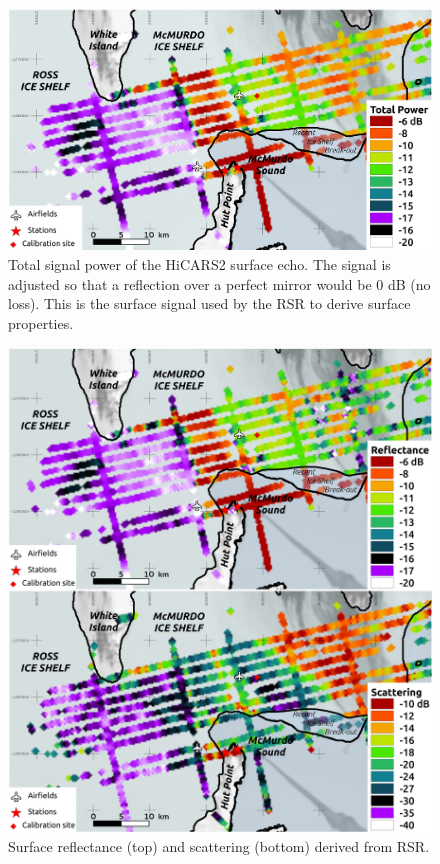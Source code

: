 \documentclass[agums,grl]{agutexSI}
\begin{document}
\newpage


 \begin{figure}
 \noindent\includegraphics[width=\textwidth]{figS2}
\caption{Total signal power of the HiCARS2 surface echo. The signal is adjusted so that a reflection over a perfect mirror would be 0 dB (no loss). This is the surface signal used by the RSR to derive surface properties.}
 \label{pt}
 \end{figure}


 \begin{figure}
 \noindent\includegraphics[width=\textwidth]{figS3}
\caption{Surface reflectance (top) and scattering (bottom) derived from RSR.}
 \label{pcpn}
 \end{figure}
 
\end{document}
